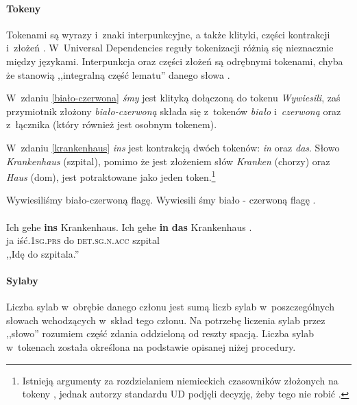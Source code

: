 \paragraph{Tokeny}
Tokenami są wyrazy i~znaki interpunkcyjne, a także klityki, części kontrakcji i~złożeń \citep{riedl2018using}. W~Universal Dependencies reguły tokenizacji różnią się nieznacznie między językami. Interpunkcja oraz części złożeń są odrębnymi tokenami, chyba że stanowią ,,integralną część lematu'' danego słowa \citep{de2021universal}.

W~zdaniu \eqref{biało-czerwona} \textit{śmy} jest klityką dołączoną do tokenu \textit{Wywiesili}, zaś przymiotnik złożony \textit{biało-czerwoną} składa się z~tokenów \textit{biało} i~\textit{czerwoną} oraz z~łącznika (który również jest osobnym tokenem).

W~zdaniu \eqref{krankenhaus} \textit{ins} jest kontrakcją dwóch tokenów: \textit{in} oraz \textit{das}. Słowo \textit{Krankenhaus} (szpital), pomimo że jest złożeniem słów \textit{Kranken} (chorzy) oraz \textit{Haus} (dom), jest potraktowane jako jeden token.\footnote{Istnieją argumenty za rozdzielaniem  niemieckich czasowników złożonych na tokeny \citep{riedl2018using}, jednak autorzy standardu UD podjęli decyzję, żeby tego nie robić \citep{de2021universal}. }

\begin{exe}
\ex \label{biało-czerwona}
Wywiesiliśmy biało-czerwoną flagę.
\gll Wywiesili śmy biało - czerwoną flagę . \\ \\

\ex \label{krankenhaus}
Ich gehe \textbf{ins} Krankenhaus.
\gll Ich gehe \textbf{in} \textbf{das} Krankenhaus . \\
ja iść\textsc{.1sg.prs} do \textsc{det.sg.n.acc} szpital \\
\glt ,,Idę do szpitala.''
\end{exe}

\paragraph{Sylaby}
Liczba sylab w~obrębie danego członu jest sumą liczb sylab w~poszczególnych słowach wchodzących w~skład tego członu. Na potrzebę liczenia sylab przez ,,słowo'' rozumiem część zdania oddzieloną od reszty spacją. Liczba sylab w~tokenach została określona na podstawie opisanej niżej procedury.

